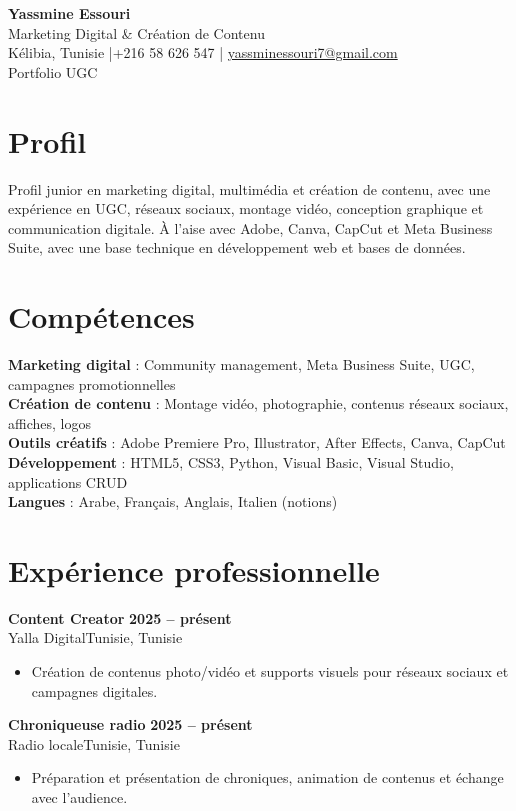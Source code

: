 \documentclass[a4paper,10pt]{article}
\newcommand{\cventry}[4]{%
  \textbf{#1} \hfill \textbf{#4}\\[1pt]
  #2{\ifx\relax#3\relax\else, #3\fi}\par\vspace{1.5pt}}
\begin{document}
\begin{center}
  {\LARGE\bfseries\color{navy} Yassmine Essouri}\\[4pt]
  {\large Marketing Digital \& Création de Contenu}\\[6pt]
  \normalsize
  Kélibia, Tunisie \quad|\quad +216 58 626 547 \quad|\quad
  \href{mailto:yassminessouri7@gmail.com}{yassminessouri7@gmail.com}\\[2pt]
  Portfolio UGC
\end{center}
\vspace{3pt}

\section{Profil}
Profil junior en marketing digital, multimédia et création de contenu, avec une expérience en UGC, réseaux sociaux, montage vidéo, conception graphique et communication digitale. À l'aise avec Adobe, Canva, CapCut et Meta Business Suite, avec une base technique en développement web et bases de données.

\section{Compétences}
\textbf{Marketing digital} : Community management, Meta Business Suite, UGC, campagnes promotionnelles\\[1pt]
\textbf{Création de contenu} : Montage vidéo, photographie, contenus réseaux sociaux, affiches, logos\\[1pt]
\textbf{Outils créatifs} : Adobe Premiere Pro, Illustrator, After Effects, Canva, CapCut\\[1pt]
\textbf{Développement} : HTML5, CSS3, Python, Visual Basic, Visual Studio, applications CRUD\\[1pt]
\textbf{Langues} : Arabe, Français, Anglais, Italien (notions)

\section{Expérience professionnelle}
\cventry{Content Creator}{Yalla Digital}{Tunisie}{2025 -- présent}
\begin{itemize}
  \item Création de contenus photo/vidéo et supports visuels pour réseaux sociaux et campagnes digitales.
\end{itemize}

\cventry{Chroniqueuse radio}{Radio locale}{Tunisie}{2025 -- présent}
\begin{itemize}
  \item Préparation et présentation de chroniques, animation de contenus et échange avec l'audience.
\end{itemize}
\end{document}
